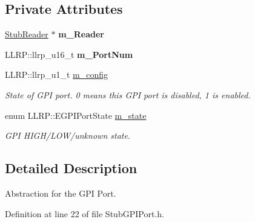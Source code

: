 \subsection*{Private Attributes}
\begin{DoxyCompactItemize}
\item 
\hypertarget{class_e_l_f_i_n_1_1_stub_g_p_i_port_a6ece56a65733ff0d7ddff15c74f47c31}{\hyperlink{class_e_l_f_i_n_1_1_stub_reader}{Stub\-Reader} $\ast$ {\bfseries m\-\_\-\-Reader}}\label{class_e_l_f_i_n_1_1_stub_g_p_i_port_a6ece56a65733ff0d7ddff15c74f47c31}

\item 
\hypertarget{class_e_l_f_i_n_1_1_stub_g_p_i_port_a14655443e6c292850538f6d39d64c366}{L\-L\-R\-P\-::llrp\-\_\-u16\-\_\-t {\bfseries m\-\_\-\-Port\-Num}}\label{class_e_l_f_i_n_1_1_stub_g_p_i_port_a14655443e6c292850538f6d39d64c366}

\item 
L\-L\-R\-P\-::llrp\-\_\-u1\-\_\-t \hyperlink{class_e_l_f_i_n_1_1_stub_g_p_i_port_a1c3280d87148997b7b64ab099e802148}{m\-\_\-config}
\begin{DoxyCompactList}\small\item\em State of G\-P\-I port. 0 means this G\-P\-I port is disabled, 1 is enabled. \end{DoxyCompactList}\item 
enum L\-L\-R\-P\-::\-E\-G\-P\-I\-Port\-State \hyperlink{class_e_l_f_i_n_1_1_stub_g_p_i_port_a6f9af5c95457b32dda056ddeb31978fc}{m\-\_\-state}
\begin{DoxyCompactList}\small\item\em G\-P\-I H\-I\-G\-H/\-L\-O\-W/unknown state. \end{DoxyCompactList}\end{DoxyCompactItemize}


\subsection{Detailed Description}
Abstraction for the G\-P\-I Port. 

Definition at line 22 of file Stub\-G\-P\-I\-Port.\-h.



